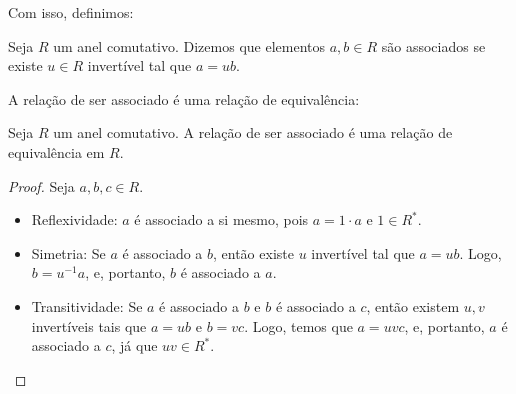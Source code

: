 Com isso, definimos:

\begin{definition}
Seja $R$ um anel comutativo.
Dizemos que elementos $a, b \in R$ são associados se existe $u \in R$ invertível tal que $a=ub$.
\end{definition}

A relação de ser associado é uma relação de equivalência:

\begin{lemma}
    Seja $R$ um anel comutativo. A relação de ser associado é uma relação de equivalência em $R$.
\end{lemma}
\begin{proof}
    Seja $a, b, c \in R$.
    \begin{itemize}
        \item Reflexividade: $a$ é associado a si mesmo, pois $a=1\cdot a$ e $1 \in R^*$.
        \item Simetria: Se $a$ é associado a $b$, então existe $u$ invertível tal que $a=ub$. Logo, $b=u^{-1}a$, e, portanto, $b$ é associado a $a$.
        \item Transitividade: Se $a$ é associado a $b$ e $b$ é associado a $c$, então existem $u, v$ invertíveis tais que $a=ub$ e $b=vc$.
        Logo, temos que $a=uvc$, e, portanto, $a$ é associado a $c$, já que $uv\in R^*$.
    \end{itemize}
\end{proof}